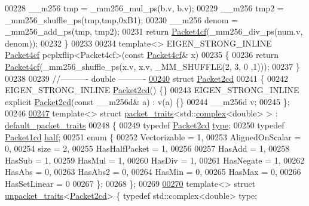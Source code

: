 \begin{DoxyCode}
00228   \_\_m256 tmp = \_mm256\_mul\_ps(b.v, b.v);
00229   \_\_m256 tmp2    = \_mm256\_shuffle\_ps(tmp,tmp,0xB1);
00230   \_\_m256 denom = \_mm256\_add\_ps(tmp, tmp2);
00231   \textcolor{keywordflow}{return} \hyperlink{struct_eigen_1_1internal_1_1_packet4cf}{Packet4cf}(\_mm256\_div\_ps(num.v, denom));
00232 \}
00233 
00234 \textcolor{keyword}{template}<> EIGEN\_STRONG\_INLINE \hyperlink{struct_eigen_1_1internal_1_1_packet4cf}{Packet4cf} pcplxflip<Packet4cf>(\textcolor{keyword}{const} 
      \hyperlink{struct_eigen_1_1internal_1_1_packet4cf}{Packet4cf}& x)
00235 \{
00236   \textcolor{keywordflow}{return} \hyperlink{struct_eigen_1_1internal_1_1_packet4cf}{Packet4cf}(\_mm256\_shuffle\_ps(x.v, x.v, \_MM\_SHUFFLE(2, 3, 0 ,1)));
00237 \}
00238 
00239 \textcolor{comment}{//---------- double ----------}
\hyperlink{struct_eigen_1_1internal_1_1_packet2cd}{00240} \textcolor{keyword}{struct }\hyperlink{struct_eigen_1_1internal_1_1_packet2cd}{Packet2cd}
00241 \{
00242   EIGEN\_STRONG\_INLINE \hyperlink{struct_eigen_1_1internal_1_1_packet2cd}{Packet2cd}() \{\}
00243   EIGEN\_STRONG\_INLINE \textcolor{keyword}{explicit} \hyperlink{struct_eigen_1_1internal_1_1_packet2cd}{Packet2cd}(\textcolor{keyword}{const} \_\_m256d& a) : v(a) \{\}
00244   \_\_m256d  v;
00245 \};
00246 
\hyperlink{struct_eigen_1_1internal_1_1packet__traits_3_01std_1_1complex_3_01double_01_4_01_4}{00247} \textcolor{keyword}{template}<> \textcolor{keyword}{struct }\hyperlink{struct_eigen_1_1internal_1_1packet__traits}{packet\_traits}<std::\hyperlink{structcomplex}{complex}<double> >  : 
      \hyperlink{struct_eigen_1_1internal_1_1default__packet__traits}{default\_packet\_traits}
00248 \{
00249   \textcolor{keyword}{typedef} \hyperlink{struct_eigen_1_1internal_1_1_packet2cd}{Packet2cd} \hyperlink{struct_eigen_1_1internal_1_1_packet2cd}{type};
00250   \textcolor{keyword}{typedef} \hyperlink{struct_eigen_1_1internal_1_1_packet1cd}{Packet1cd} \hyperlink{struct_eigen_1_1internal_1_1_packet1cd}{half};
00251   \textcolor{keyword}{enum} \{
00252     Vectorizable = 1,
00253     AlignedOnScalar = 0,
00254     size = 2,
00255     HasHalfPacket = 1,
00256 
00257     HasAdd    = 1,
00258     HasSub    = 1,
00259     HasMul    = 1,
00260     HasDiv    = 1,
00261     HasNegate = 1,
00262     HasAbs    = 0,
00263     HasAbs2   = 0,
00264     HasMin    = 0,
00265     HasMax    = 0,
00266     HasSetLinear = 0
00267   \};
00268 \};
00269 
\hyperlink{struct_eigen_1_1internal_1_1unpacket__traits_3_01_packet2cd_01_4}{00270} \textcolor{keyword}{template}<> \textcolor{keyword}{struct }\hyperlink{struct_eigen_1_1internal_1_1unpacket__traits}{unpacket\_traits}<\hyperlink{struct_eigen_1_1internal_1_1_packet2cd}{Packet2cd}> \{ \textcolor{keyword}{typedef} std::complex<double> type; \textcolor{keyword}{
}
\end{DoxyCode}
